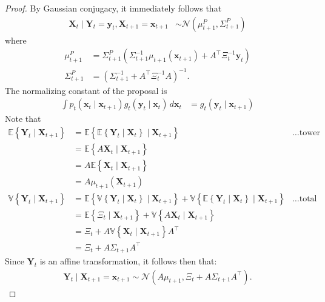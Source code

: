 \begin{proof}
    By Gaussian conjugacy, it immediately follows that
    \begin{align*}
        \mathbf{X}_{t} \mid \mathbf{Y}_{t} = \mathbf{y}_{t}, \mathbf{X}_{t+1} = \mathbf{x}_{t+1} &\sim \mathcal{N}\left( \mu_{t+1}^P, \Sigma_{t+1}^P \right) 
    \end{align*}
    where
    \begin{align*}
        \mu_{t+1}^P &= \Sigma_{t+1}^P\left( \Sigma_{t+1}^{-1}\mu_{t+1}(\mathbf{x}_{t+1}) + A^\top\Xi_{t}^{-1}\mathbf{y}_{t} \right) \\
        \Sigma_{t+1}^P &= \left( \Sigma_{t+1}^{-1} + A^\top \Xi_{t}^{-1}A \right)^{-1}.
    \end{align*}
    The normalizing constant of the proposal is
    \begin{align*}
        \int p_{t}(\mathbf{x}_{t} \mid \mathbf{x}_{t+1})g_{t}(\mathbf{y}_{t} \mid \mathbf{x}_{t}) \, d\mathbf{x}_{t} &= g_{t}(\mathbf{y}_{t} \mid \mathbf{x}_{t+1})
    \end{align*}
    Note that
    \begin{align*}
        \mathbb{E}\left\{ \mathbf{Y}_{t} \mid \mathbf{X}_{t+1} \right\} &= \mathbb{E}\left\{\mathbb{E}\left\{\mathbf{Y}_{t} \mid \mathbf{X}_{t}\right\} \mid \mathbf{X}_{t+1}\right\} &\dots\text{tower property} \\
        &= \mathbb{E}\left\{A\mathbf{X}_{t} \mid \mathbf{X}_{t+1}\right\} \\
        &= A\mathbb{E}\left\{\mathbf{X}_{t} \mid \mathbf{X}_{t+1}\right\} \\
        &= A\mu_{t+1}(\mathbf{X}_{t+1}) \\
        \mathbb{V}\left\{\mathbf{Y}_{t} \mid \mathbf{X}_{t+1}\right\} &= \mathbb{E}\left\{\mathbb{V}\left\{\mathbf{Y}_{t} \mid \mathbf{X}_{t}\right\} \mid \mathbf{X}_{t+1}\right\} + \mathbb{V}\left\{\mathbb{E}\left\{\mathbf{Y}_{t} \mid \mathbf{X}_{t}\right\} \mid \mathbf{X}_{t+1}\right\} &\dots \text{total variance} \\
        &= \mathbb{E}\left\{\Xi_{t} \mid \mathbf{X}_{t+1}\right\} + \mathbb{V}\left\{A\mathbf{X}_{t} \mid \mathbf{X}_{t+1}\right\} \\
        &= \Xi_{t} + A\mathbb{V}\left\{\mathbf{X}_{t} \mid \mathbf{X}_{t+1}\right\}A^{\top} \\
        &= \Xi_{t} + A\Sigma_{t+1}A^{\top}
    \end{align*}
    Since $\mathbf{Y}_{t}$ is an affine transformation, it follows then that:
    \begin{align*}
        \mathbf{Y}_{t} \mid \mathbf{X}_{t+1} = \mathbf{x}_{t+1} \sim \mathcal{N}\left( A\mu_{t+1}, \Xi_{t} + A\Sigma_{t+1}A^\top \right).
    \end{align*}
\end{proof}

